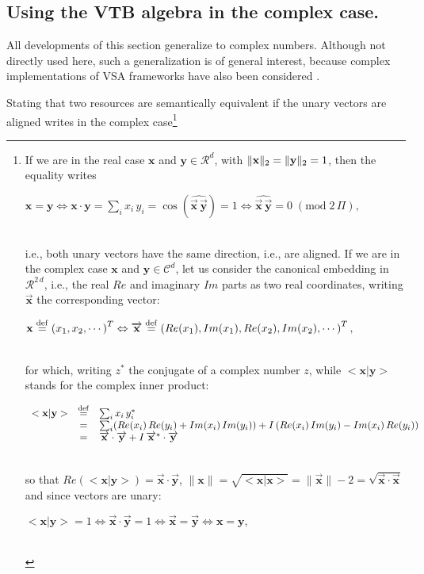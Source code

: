 \documentclass[sn-mathphys]{sn-jnl}
\newcommand{\defq}{\stackrel {\rm def}{=}}
\newcommand{\eqline}[1]{~\vspace{0.1cm}\\\centerline{$#1$}\vspace{0.1cm}\\}
\begin{document}
\begin{appendices}
\subsection*{Using the VTB algebra in the complex case.}

All developments of this section generalize to complex numbers. Although not directly used here, such a generalization is of general interest, because complex implementations of VSA frameworks have also been considered \cite{schlegel_comparison_2020}.

Stating that two resources are semantically equivalent if the unary vectors are aligned writes in the complex case\footnote{If we are in the real case $\mathbf{x}$ and $\mathbf{y} \in {\mathcal R}^d$, with $\|{\bf x}\|_2 = \|{\bf y}\|_2 = 1$, then the equality writes
\eqline{\mathbf{x} = \mathbf{y} \Leftrightarrow \mathbf{x} \cdot \mathbf{y} = \sum_i x_i \, y_i = \cos\left(\widehat{\overrightarrow{\mathbf{x}} \, \overrightarrow{\mathbf{y}}}\right) = 1 \Leftrightarrow \widehat{\overrightarrow{\mathbf{x}} \, \overrightarrow{\mathbf{y}}} = 0 \; (\mbox{mod} \; 2 \, \Pi),}
i.e., both unary vectors have the same direction, i.e., are aligned.
If we are in the complex case $\mathbf{x}$ and $\mathbf{y} \in {\mathcal C}^d$, let us consider the canonical embedding in ${\mathcal R}^{2\,d}$, i.e., the real $Re$ and imaginary $Im$ parts as two real coordinates, writing $\overrightarrow{\mathbf{x}}$ the corresponding vector:
\eqline{\mathbf{x} \defq \left(x_1, x_2, \cdots \right)^T \Leftrightarrow \overrightarrow{\mathbf{x}} \defq \left(Re(x_1), Im(x_1), Re(x_2), Im(x_2), \cdots\right)^T,}
for which, writing $z^*$ the conjugate of a complex number $z$, while $<\mathbf{x} \vert \mathbf{y}>$ stands for the complex inner product:
\eqline{\begin{array}{rcl}<\mathbf{x} \vert \mathbf{y}> 
&\defq& \sum_i x_i \, y_i^* \\
&=& \sum_i 
  (Re(x_i) \, Re(y_i) + Im(x_i) \, Im(y_i)) + I \, (Re(x_i) \, Im(y_i) - Im(x_i) \, Re(y_i)) \\
&=&
  \overrightarrow{\mathbf{x}} \cdot \overrightarrow{\mathbf{y}} + I \, 
  \overrightarrow{\mathbf{x}}^* \cdot \overrightarrow{\mathbf{y}}
\end{array}}
so that $Re(<\mathbf{x} \vert \mathbf{y}>) = \overrightarrow{\mathbf{x}} \cdot \overrightarrow{\mathbf{y}}$, $\|\mathbf{x}\| = \sqrt{<\mathbf{x} \vert \mathbf{x}>} = \|\overrightarrow{\mathbf{x}}\|-2 = \sqrt{\overrightarrow{\mathbf{x}} \cdot \overrightarrow{\mathbf{x}}}$ and since vectors are unary: 
\eqline{<\mathbf{x} \vert \mathbf{y}> = 1 \Leftrightarrow \overrightarrow{\mathbf{x}} \cdot \overrightarrow{\mathbf{y}} = 1 \Leftrightarrow \overrightarrow{\mathbf{x}} = \overrightarrow{\mathbf{y}} \Leftrightarrow \mathbf{x} = \mathbf{y},}
}
\end{appendices}
\end{document}
